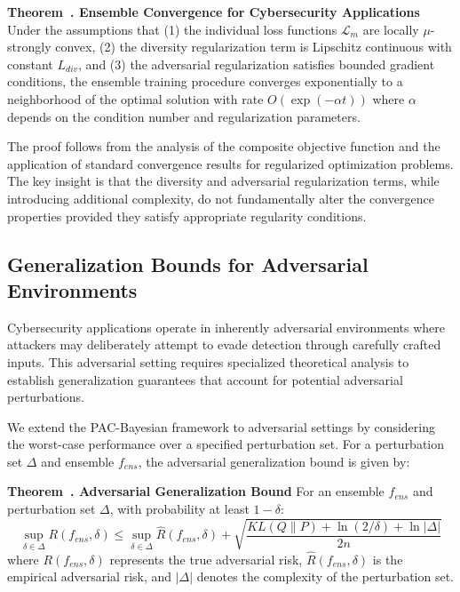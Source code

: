 \documentclass[journal]{IEEEtran}
\newcounter{theorem}
\newenvironment{theorem}[1][]{\refstepcounter{theorem}\par\medskip
   \noindent \textbf{Theorem~\thetheorem. #1} \rmfamily}{\medskip}
\begin{document}
\begin{theorem}[Ensemble Convergence for Cybersecurity Applications]
Under the assumptions that (1) the individual loss functions $\mathcal{L}_m$ are locally $\mu$-strongly convex, (2) the diversity regularization term is Lipschitz continuous with constant $L_{div}$, and (3) the adversarial regularization satisfies bounded gradient conditions, the ensemble training procedure converges exponentially to a neighborhood of the optimal solution with rate $O(\exp(-\alpha t))$ where $\alpha$ depends on the condition number and regularization parameters.
\end{theorem}

The proof follows from the analysis of the composite objective function and the application of standard convergence results for regularized optimization problems. The key insight is that the diversity and adversarial regularization terms, while introducing additional complexity, do not fundamentally alter the convergence properties provided they satisfy appropriate regularity conditions.

\subsection{Generalization Bounds for Adversarial Environments}

Cybersecurity applications operate in inherently adversarial environments where attackers may deliberately attempt to evade detection through carefully crafted inputs. This adversarial setting requires specialized theoretical analysis to establish generalization guarantees that account for potential adversarial perturbations.

We extend the PAC-Bayesian framework to adversarial settings by considering the worst-case performance over a specified perturbation set. For a perturbation set $\Delta$ and ensemble $f_{ens}$, the adversarial generalization bound is given by:

\begin{theorem}[Adversarial Generalization Bound]
For an ensemble $f_{ens}$ and perturbation set $\Delta$, with probability at least $1-\delta$:
\begin{equation}
\sup_{\delta \in \Delta} R(f_{ens}, \delta) \leq \sup_{\delta \in \Delta} \hat{R}(f_{ens}, \delta) + \sqrt{\frac{KL(Q \| P) + \ln(2/\delta) + \ln|\Delta|}{2n}}
\end{equation}
where $R(f_{ens}, \delta)$ represents the true adversarial risk, $\hat{R}(f_{ens}, \delta)$ is the empirical adversarial risk, and $|\Delta|$ denotes the complexity of the perturbation set.
\end{theorem}
\end{document}
